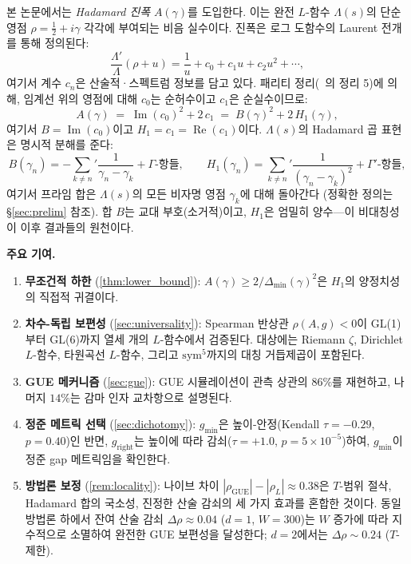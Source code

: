 \documentclass[11pt,a4paper]{article}
\theoremstyle{plain}
\theoremstyle{definition}
\DeclareMathOperator{\GUE}{GUE}
\newcommand{\La}{\Lambda}
\begin{document}
본 논문에서는 \emph{Hadamard 진폭} $A(\gamma)$를 도입한다.
이는 완전 $L$-함수 $\La(s)$의 단순 영점
$\rho = \tfrac{1}{2} + i\gamma$ 각각에 부여되는 비음 실수이다.
진폭은 로그 도함수의 Laurent 전개를 통해 정의된다:
\begin{equation}\label{eq:laurent}
  \frac{\La'}{\La}(\rho + u) = \frac{1}{u} + c_0 + c_1 u
  + c_2 u^2 + \cdots,
\end{equation}
여기서 계수 $c_n$은 산술적·스펙트럼 정보를 담고 있다.
패리티 정리(~\cite{paper2}의 정리 5)에 의해, 임계선 위의 영점에 대해
$c_0$는 순허수이고 $c_1$은 순실수이므로:
\begin{equation}\label{eq:amplitude_def}
  A(\gamma) \;=\; \operatorname{Im}(c_0)^2 + 2\,c_1
  \;=\; B(\gamma)^2 + 2\,H_1(\gamma),
\end{equation}
여기서 $B = \operatorname{Im}(c_0)$이고 $H_1 = c_1 = \operatorname{Re}(c_1)$이다.
$\La(s)$의 Hadamard 곱 표현은 명시적 분해를 준다:
\begin{equation}\label{eq:hadamard_decomp}
  B(\gamma_n) = -\sum_{k \ne n}' \frac{1}{\gamma_n - \gamma_k}
  + \Gamma\text{-항들}, \qquad
  H_1(\gamma_n) = \sum_{k \ne n}' \frac{1}{(\gamma_n - \gamma_k)^2}
  + \Gamma'\text{-항들},
\end{equation}
여기서 프라임 합은 $\La(s)$의 모든 비자명 영점 $\gamma_k$에 대해 돌아간다
(정확한 정의는 \S\ref{sec:prelim} 참조).
합 $B$는 교대 부호(소거적)이고, $H_1$은 엄밀히 양수---이 비대칭성이
이후 결과들의 원천이다.

\medskip\noindent\textbf{주요 기여.}
\begin{enumerate}[label=(\roman*)]
  \item \textbf{무조건적 하한} (\cref{thm:lower_bound}):
        $A(\gamma) \ge 2/\Delta_{\min}(\gamma)^2$은
        $H_1$의 양정치성의 직접적 귀결이다.
  \item \textbf{차수-독립 보편성}
        (\cref{sec:universality}): Spearman 반상관
        $\rho(A, g) < 0$이 GL(1)부터 GL(6)까지 열세 개의 $L$-함수에서
        검증된다. 대상에는 Riemann $\zeta$, Dirichlet $L$-함수,
        타원곡선 $L$-함수, 그리고 $\mathrm{sym}^5$까지의 대칭 거듭제곱이 포함된다.
  \item \textbf{GUE 메커니즘} (\cref{sec:gue}): GUE 시뮬레이션이
        관측 상관의 $86\%$를 재현하고, 나머지 $14\%$는
        감마 인자 교차항으로 설명된다.
  \item \textbf{정준 메트릭 선택}
        (\cref{sec:dichotomy}): $g_{\min}$은
        높이-안정(Kendall $\tau = -0.29$, $p = 0.40$)인 반면,
        $g_{\mathrm{right}}$는 높이에 따라 감쇠($\tau = +1.0$,
        $p = 5 \times 10^{-5}$)하여, $g_{\min}$이 정준 gap 메트릭임을 확인한다.
  \item \textbf{방법론 보정}
        (\cref{rem:locality}): 나이브 차이
        $|\rho_{\GUE}| - |\rho_L| \approx 0.38$은
        $T$-범위 절삭, Hadamard 합의 국소성, 진정한 산술 감쇠의
        세 가지 효과를 혼합한 것이다.
        동일 방법론 하에서 잔여 산술 감쇠
        $\Delta\rho \approx 0.04$ ($d = 1$, $W\!=\!300$)는
        $W$ 증가에 따라 지수적으로 소멸하여 완전한 GUE 보편성을 달성한다;
        $d = 2$에서는 $\Delta\rho \sim\!0.24$ ($T$-제한).
\end{enumerate}
\end{document}

